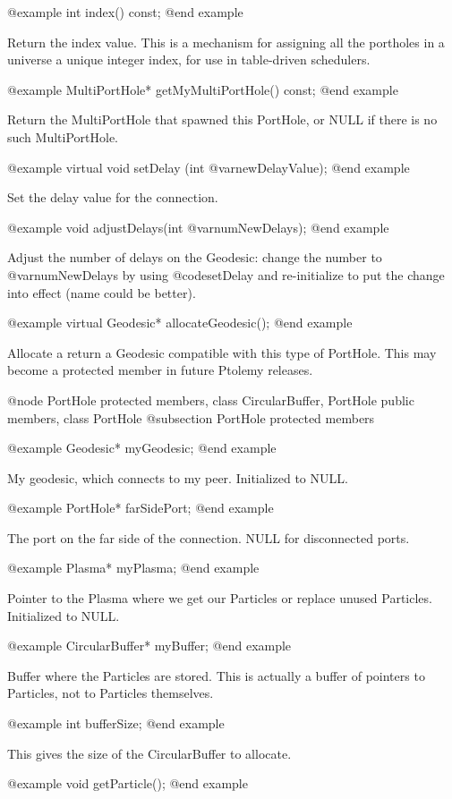@example
int index() const;
@end example

Return the index value.  This is a mechanism for assigning all the
portholes in a universe a unique integer index, for use in table-driven
schedulers.

@example
MultiPortHole* getMyMultiPortHole() const;
@end example

Return the MultiPortHole that spawned this PortHole, or NULL
if there is no such MultiPortHole.

@example
virtual void setDelay (int @var{newDelayValue});
@end example

Set the delay value for the connection.

@example
void adjustDelays(int @var{numNewDelays});
@end example

Adjust the number of delays on the Geodesic: change the number to
@var{numNewDelays} by using @code{setDelay} and re-initialize to
put the change into effect (name could be better).

@example
virtual Geodesic* allocateGeodesic();
@end example

Allocate a return a Geodesic compatible with this type of PortHole.
This may become a protected member in future Ptolemy releases.

@node PortHole protected members, class CircularBuffer, PortHole public members, class PortHole
@subsection PortHole protected members

@example
Geodesic* myGeodesic;
@end example

My geodesic, which connects to my peer.  Initialized to NULL.

@example
PortHole* farSidePort;
@end example

The port on the far side of the connection.  NULL for disconnected ports.

@example
Plasma* myPlasma;
@end example

Pointer to the Plasma where we get our Particles or replace unused
Particles.  Initialized to NULL.

@example
CircularBuffer* myBuffer;
@end example

Buffer where the Particles are stored.  This is actually a buffer of
pointers to Particles, not to Particles themselves.

@example
int bufferSize;
@end example

This gives the size of the CircularBuffer to allocate.

@example
void getParticle();
@end example

